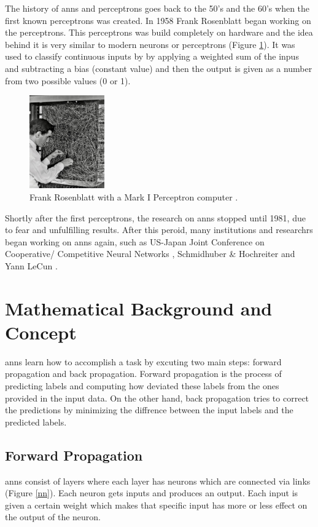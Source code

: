 \documentclass[runningheads]{llncs}
\begin{document}
The history of \gls{anns} and perceptrons goes back to the 50's and the 60's when 
the first known perceptrons was created. In 1958 Frank Rosenblatt began working on the perceptrons.  
This perceptrons was build completely on hardware and the idea behind it is very similar 
to modern neurons or perceptrons (Figure \ref{fpp}). It was used to classify continuous inputs by 
by applying a weighted sum of the inpus and subtracting a bias (constant value) and 
then the output is given as a number from two possible values (0 or 1).
\begin{figure}[H]
    \label{fpp}
    \centering
    \includegraphics[height=4cm]{imge1}
    \caption{Frank Rosenblatt with a Mark I Perceptron computer \cite{frankpic}.}
\end{figure}
Shortly after the first perceptrons, 
the research on \gls{anns} stopped until 1981, due to fear and unfulfilling results.
After this peroid, many institutions and researchrs began working on \gls{anns} again, such as 
US-Japan Joint Conference on Cooperative/ Competitive Neural Networks \cite{amari1982competition}, Schmidhuber \& Hochreiter \cite{hochreiter1997long} and Yann LeCun \cite{lecun1998gradient}. 



\section{Mathematical Background and Concept}
\gls{anns} learn how to accomplish a task by excuting two main steps:
forward propagation and back propagation. Forward propagation is the process of
predicting labels and computing how deviated these labels from the ones provided in the input data.
On the other hand, back propagation tries to correct the predictions by minimizing
the diffrence between the input labels and the predicted labels. 
\subsection{Forward Propagation}
\label{fb}
\gls{anns} consist of layers where each layer has neurons which are connected via links (Figure \ref{nn}). Each neuron gets inputs and produces an output. 
Each input is given a certain weight which makes that specific input has more or less effect on the output of the neuron.
\end{document}
